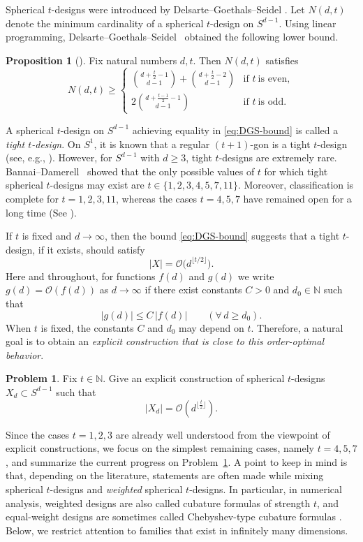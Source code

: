 \documentclass{amsart}
\theoremstyle{definition}
\newtheorem{proposition}[theorem]{Proposition}
\newtheorem{problem}[theorem]{Problem}
\theoremstyle{remark}
\numberwithin{equation}{section}
\newcommand{\N}{{\mathbb N}}
\newcommand{\order}{\mathcal{O}}
\begin{document}
Spherical $t$-designs were introduced by Delsarte--Goethals--Seidel \cite{DGS1977}.
Let $N(d,t)$ denote the minimum cardinality of a spherical $t$-design on $S^{d-1}$.
Using linear programming, Delsarte--Goethals--Seidel~\cite{DGS1977} obtained the following lower bound.
\begin{proposition}[{\cite{DGS1977}}]\label{prop:tight}
Fix natural numbers $d,t$. Then $N(d,t)$ satisfies
\begin{equation}\label{eq:DGS-bound}
    N(d,t)\ge
    \begin{cases}
        \binom{d+\frac{t}{2}-1}{d-1}+\binom{d+\frac{t}{2}-2}{d-1}& \text{if }t\ \text{is even},\\[2mm]
        2\binom{d+\frac{t-1}{2}-1}{d-1}& \text{if }t\ \text{is odd}.
    \end{cases}
\end{equation}
\end{proposition}
A spherical $t$-design on $S^{d-1}$ achieving equality in \eqref{eq:DGS-bound} is called a \emph{tight $t$-design}.
On $S^{1}$, it is known that a regular $(t+1)$-gon is a tight $t$-design (see, e.g., \cite{DGS1977}).
However, for $S^{d-1}$ with $d\ge 3$, tight $t$-designs are extremely rare.
Bannai--Damerell~\cite{BannaiDamerell1979,BannaiDamerell1980} showed that the only possible values of $t$ for which tight spherical $t$-designs may exist are
$t\in\{1,2,3,4,5,7,11\}$.
Moreover, classification is complete for $t=1,2,3,11$, whereas the cases $t=4,5,7$ have remained open for a long time (See \cite{BB2009}).

If $t$ is fixed and $d\to\infty$, then the bound \eqref{eq:DGS-bound} suggests that a tight $t$-design, if it exists, should satisfy
\[
|X|=\order\bigl(d^{\lfloor t/2\rfloor}\bigr).
\]
Here and throughout, for functions $f(d)$ and $g(d)$ we write $g(d)=\order(f(d))$ as $d\to\infty$ if there exist constants $C>0$ and $d_0\in\N$ such that
\[
|g(d)|\le C\,|f(d)| \qquad (\forall\, d\ge d_0).
\]
When $t$ is fixed, the constants $C$ and $d_0$ may depend on $t$.
Therefore, a natural goal is to obtain an \emph{explicit construction that is close to this order-optimal behavior}.

\begin{problem}\label{prob:construct_dual}
Fix $t \in \N$. Give an explicit construction of spherical $t$-designs $X_d\subset S^{d-1}$ such that
\[
|X_d|=\order(d^{\lfloor \frac{t}{2}\rfloor}).
\]
\end{problem}

Since the cases $t=1,2,3$ are already well understood from the viewpoint of explicit constructions, we focus on the simplest remaining cases, namely $t=4,5,7$, and summarize the current progress on Problem~\ref{prob:construct_dual}.
A point to keep in mind is that, depending on the literature, statements are often made while mixing spherical $t$-designs and \emph{weighted} spherical $t$-designs.
In particular, in numerical analysis, weighted designs are also called cubature formulas of strength $t$,
and equal-weight designs are sometimes called Chebyshev-type cubature formulas
\cite{Cools1997,Stroud1971,RB1991}.
Below, we restrict attention to families that exist in infinitely many dimensions.
\end{document}
